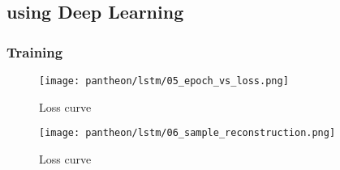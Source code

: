 \subsection{using Deep Learning}
\subsubsection{Training}
\begin{figure}[H]
	\centering
	\texttt{[image: pantheon/lstm/05\_epoch\_vs\_loss.png]}
	\caption{Loss curve}
	\label{fig:loss_curve_union}
\end{figure}
\begin{figure}[H]
	\centering
	\texttt{[image: pantheon/lstm/06\_sample\_reconstruction.png]}
	\caption{Loss curve}
	\label{fig:reconstruction_lstm_union}
\end{figure}
